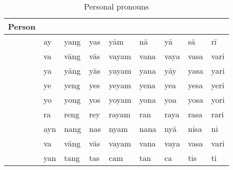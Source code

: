 \begin{table}[tp]\centering
\caption{Personal pronouns}

\begin{tabu} to \linewidth{l X[c] X[c] X[c] X[c] X[c] X[c] X[c] X[c]}
\tableheaderfont\toprule
Person
	& \Top{}
	& \Aarg{}
	& \Parg{}
	& \Dat{}
	& \Gen{}
	& \Loc{}
	& \Caus{}
	& \Ins{}
	\\
\toprule

\Fsg{}
	& ay	%
	& yang	%
	& yas	%
	& yām	%
	& nā	%
	& yā	%
	& sā	%
	& rī	%
	\\
	
\midrule

\Ssg{}
	& va	%
	& vāng	%
	& vās	%
	& vayam	%
	& vana	%
	& vaya	%
	& vasa	%
	& vari	%
	\\

\midrule

\TsgM{}
	& ya	%
	& yāng	%
	& yās	%
	& yayam	%
	& yana	%
	& yāy	%
	& yasa	%
	& yari	%
	\\

\TsgF{}
	& ye	%
	& yeng	%
	& yes	%
	& yeyam	%
	& yena	%
	& yea	%
	& yesa	%
	& yeri	%
	\\

\TsgN{}
	& yo	%
	& yong	%
	& yos	%
	& yoyam	%
	& yona	%
	& yoa	%
	& yosa	%
	& yori	%
	\\

\TsgI{}
	& ra	%
	& reng	%
	& rey	%
	& rayam	%
	& ran	%
	& raya	%
	& rasa	%
	& rari	%
	\\

\midrule

\Fpl{}
	& ayn	%
	& nang	%
	& nas	%
	& nyam	%
	& nana	%
	& nyā	%
	& nisa	%
	& ni	%
	\\
	
\midrule

\Spl{}
	& va	%
	& vāng	%
	& vās	%
	& vayam	%
	& vana	%
	& vaya	%
	& vasa	%
	& vari	%
	\\

\midrule

\TplM{}
	& yan	%
	& tang	%
	& tas	%
	& cam	%
	& tan	%
	& ca	%
	& tis	%
	& ti	%
	\\


\end{tabu}
\end{table}
